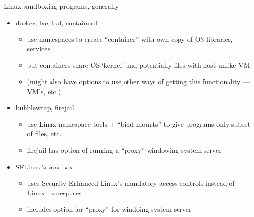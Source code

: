 \begin{frame}{Linux sandboxing programs, generally}
    \begin{itemize}
    \item docker, lxc, lxd, containerd
        \begin{itemize}
        \item use namespaces to create ``container'' with own copy of OS libraries, services
        \item but containers share OS `kernel' and potentially files with host unlike VM
        \item (might also have options to use other ways of getting this functionality --- VM's, etc.)
        \end{itemize}
    \item bubblewrap, firejail
        \begin{itemize}
        \item use Linux namespace tools + ``bind mounts'' to give programs only subset of files, etc.
        \item firejail has option of running a ``proxy'' windowing system server
        \end{itemize}
    \item SELinux's sandbox
        \begin{itemize}
        \item uses Security Enhanced Linux's mandatory access controls instead of Linux namespaces
        \item includes option for ``proxy'' for windoing system server
        \end{itemize}
    \end{itemize}
\end{frame}
